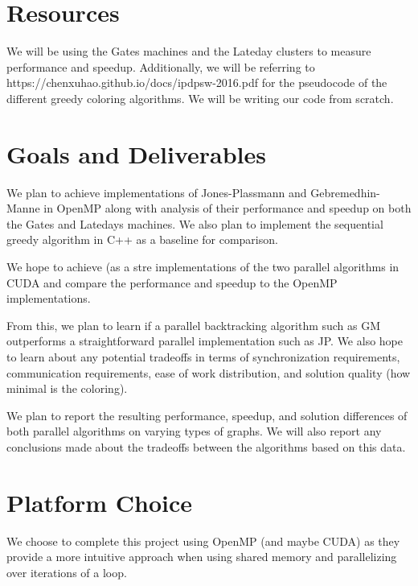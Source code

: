 \documentclass[11pt]{article}
\begin{document}
\section{Resources}
We will be using the Gates machines and the Lateday clusters to measure performance and speedup. Additionally, we will be referring to https://chenxuhao.github.io/docs/ipdpsw-2016.pdf for the pseudocode of the different greedy coloring algorithms. We will be writing our code from scratch.

\section{Goals and Deliverables}
We plan to achieve implementations of Jones-Plassmann and Gebremedhin-Manne in OpenMP along with analysis of their performance and speedup on both the Gates and Latedays machines. We also plan to implement the sequential greedy algorithm in C++ as a baseline for comparison.

We hope to achieve (as a stre implementations of the two parallel algorithms in CUDA and compare the performance and speedup to the OpenMP implementations. 

From this, we plan to learn if a parallel backtracking algorithm such as GM outperforms a straightforward parallel implementation such as JP. We also hope to learn about any potential tradeoffs in terms of synchronization requirements, communication requirements, ease of work distribution, and solution quality (how minimal is the coloring).  

We plan to report the resulting performance, speedup, and solution differences of both parallel algorithms on varying types of graphs. We will also report any conclusions made about the tradeoffs between the algorithms based on this data.

\section{Platform Choice}
We choose to complete this project using OpenMP (and maybe CUDA) as they provide a more intuitive approach when using shared memory and parallelizing over iterations of a loop. 
\end{document}
